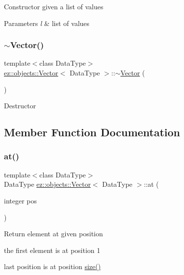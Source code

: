 Constructor given a list of values 
\begin{DoxyParams}{Parameters}
{\em l} & list of values \\
\hline
\end{DoxyParams}
\mbox{\label{classez_1_1objects_1_1Vector_a71fe918da47724d508de0875b6bc5fdd}} 
\subsubsection{\texorpdfstring{$\sim$\+Vector()}{~Vector()}}
{\footnotesize\ttfamily template$<$class Data\+Type$>$ \\
\hyperlink{classez_1_1objects_1_1Vector}{ez\+::objects\+::\+Vector}$<$ Data\+Type $>$\+::$\sim$\hyperlink{classez_1_1objects_1_1Vector}{Vector} (\begin{DoxyParamCaption}{ }\end{DoxyParamCaption})\hspace{0.3cm}{\ttfamily [inline]}}

Destructor 

\subsection{Member Function Documentation}
\mbox{\label{classez_1_1objects_1_1Vector_a167a5c74341831e735f10bb731fb2e6f}} 
\subsubsection{\texorpdfstring{at()}{at()}}
{\footnotesize\ttfamily template$<$class Data\+Type$>$ \\
Data\+Type \hyperlink{classez_1_1objects_1_1Vector}{ez\+::objects\+::\+Vector}$<$ Data\+Type $>$\+::at (\begin{DoxyParamCaption}\item[{integer}]{pos }\end{DoxyParamCaption})\hspace{0.3cm}{\ttfamily [inline]}}

Return element at given position 
\begin{DoxyItemize}
\item the first element is at position 1 
\item last position is at position \hyperlink{classez_1_1objects_1_1Vector_a0c9401b7eb53dc1bff3becb8d87e5a90}{size()} 
\end{DoxyItemize}\mbox{\label{classez_1_1objects_1_1Vector_a93276f2c67cc9acf95a9a571b574dcd7}} 
